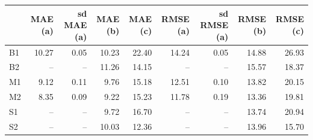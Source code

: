\begin{tabular}{lrrrrrrrr}
\toprule
 & MAE (a) & sd MAE (a) & MAE (b) & MAE (c) & RMSE (a) & sd RMSE (a) & RMSE (b) & RMSE (c) \\
\midrule
B1 & 10.27 & 0.05 & 10.23 & 22.40 & 14.24 & 0.05 & 14.88 & 26.93 \\
B2 & -- & -- & 11.26 & 14.15 & -- & -- & 15.57 & 18.37 \\
M1 & 9.12 & 0.11 & 9.76 & 15.18 & 12.51 & 0.10 & 13.82 & 20.15 \\
M2 & 8.35 & 0.09 & 9.22 & 15.23 & 11.78 & 0.19 & 13.36 & 19.81 \\
S1 & -- & -- & 9.72 & 16.70 & -- & -- & 13.74 & 20.94 \\
S2 & -- & -- & 10.03 & 12.36 & -- & -- & 13.96 & 15.70 \\
\bottomrule
\end{tabular}
